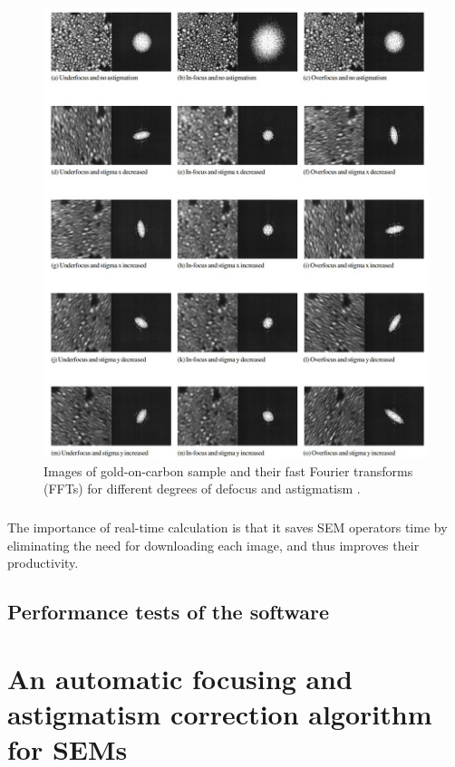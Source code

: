 \documentclass[12pt, twocolumn]{report}
\begin{document}
\begin{figure}
    \centering
    \includegraphics[width=1.05\textwidth]{Figures/SEM astigmatism and FFT.jpg}
    \caption{Images of gold-on-carbon sample and their fast Fourier transforms (FFTs) for different degrees of defocus and astigmatism \cite{SEM correction algorithm}.}
    \label{SEM astigmatism}
\end{figure}

\paragraph{}
The importance of real-time calculation is that it saves SEM operators time by eliminating the need for downloading each image, and thus improves their productivity.

\section{Performance tests of the software}

\chapter{An automatic focusing and astigmatism correction algorithm for SEMs}
\end{document}
